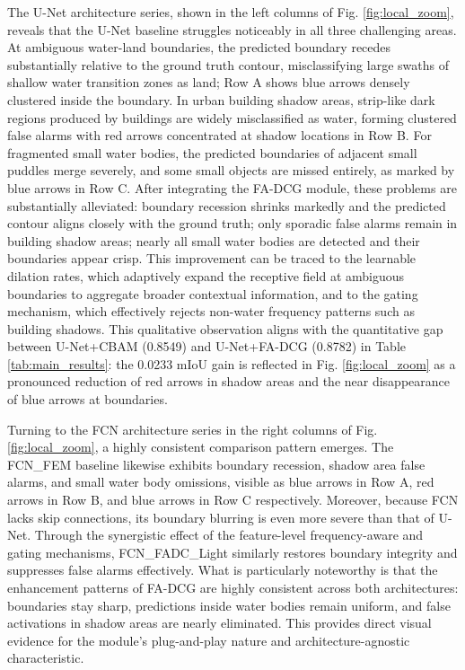 \documentclass[lettersize,journal]{IEEEtran}
\begin{document}
The U-Net architecture series, shown in the left columns of Fig. \ref{fig:local_zoom}, reveals that the U-Net baseline struggles noticeably in all three challenging areas. At ambiguous water-land boundaries, the predicted boundary recedes substantially relative to the ground truth contour, misclassifying large swaths of shallow water transition zones as land; Row A shows blue arrows densely clustered inside the boundary. In urban building shadow areas, strip-like dark regions produced by buildings are widely misclassified as water, forming clustered false alarms with red arrows concentrated at shadow locations in Row B. For fragmented small water bodies, the predicted boundaries of adjacent small puddles merge severely, and some small objects are missed entirely, as marked by blue arrows in Row C. After integrating the FA-DCG module, these problems are substantially alleviated: boundary recession shrinks markedly and the predicted contour aligns closely with the ground truth; only sporadic false alarms remain in building shadow areas; nearly all small water bodies are detected and their boundaries appear crisp. This improvement can be traced to the learnable dilation rates, which adaptively expand the receptive field at ambiguous boundaries to aggregate broader contextual information, and to the gating mechanism, which effectively rejects non-water frequency patterns such as building shadows. This qualitative observation aligns with the quantitative gap between U-Net+CBAM (0.8549) and U-Net+FA-DCG (0.8782) in Table \ref{tab:main_results}: the 0.0233 mIoU gain is reflected in Fig. \ref{fig:local_zoom} as a pronounced reduction of red arrows in shadow areas and the near disappearance of blue arrows at boundaries.

Turning to the FCN architecture series in the right columns of Fig. \ref{fig:local_zoom}, a highly consistent comparison pattern emerges. The FCN\_FEM baseline likewise exhibits boundary recession, shadow area false alarms, and small water body omissions, visible as blue arrows in Row A, red arrows in Row B, and blue arrows in Row C respectively. Moreover, because FCN lacks skip connections, its boundary blurring is even more severe than that of U-Net. Through the synergistic effect of the feature-level frequency-aware and gating mechanisms, FCN\_FADC\_Light similarly restores boundary integrity and suppresses false alarms effectively. What is particularly noteworthy is that the enhancement patterns of FA-DCG are highly consistent across both architectures: boundaries stay sharp, predictions inside water bodies remain uniform, and false activations in shadow areas are nearly eliminated. This provides direct visual evidence for the module's plug-and-play nature and architecture-agnostic characteristic.
\end{document}
